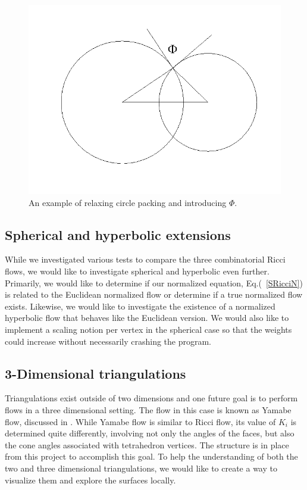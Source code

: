 \documentclass[12pt]{article}
\begin{document}
\begin{figure}
\begin{center}
\includegraphics[scale = 0.6]{Pictures/intcirc2.png}
\end{center}
\caption{An example of relaxing circle packing and introducing $\Phi.$}
\label{fig:intcirc}
\end{figure}

\subsection{Spherical and hyperbolic extensions}
While we investigated various tests to compare the three combinatorial Ricci flows, we would like to investigate spherical and hyperbolic even further. Primarily, we would like to determine if our normalized equation, Eq.(~\ref{SRicciN}) is related to the Euclidean normalized flow or determine if a true normalized flow exists. Likewise, we would like to investigate the existence of a normalized hyperbolic flow that behaves like the Euclidean version. We would also like to implement a scaling notion per vertex in the spherical case so that the weights could increase without necessarily crashing the program. 

\subsection{3-Dimensional triangulations}
Triangulations exist outside of two dimensions and one future goal is to perform flows in a three dimensional setting. The flow in this case is known as Yamabe flow, discussed in \cite{DrG}. While Yamabe flow is similar to Ricci flow, its value of $K_i$ is determined quite differently, involving not only the angles of the faces, but also the cone angles associated with tetrahedron vertices. The structure is in place from this project to accomplish this goal. To help the understanding of both the two and three dimensional triangulations, we would like to create a way to visualize them and explore the surfaces locally.
\end{document}
